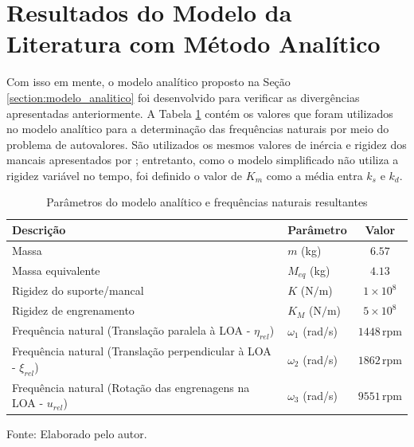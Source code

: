 \section{Resultados do Modelo da Literatura com Método Analítico}

Com isso em mente, o modelo analítico proposto na Seção \ref{section:modelo_analitico} foi desenvolvido para verificar as divergências apresentadas anteriormente. A Tabela \ref{tab:modelo_analitico} contém os valores que foram utilizados no modelo analítico para a determinação das frequências naturais por meio do problema de autovalores. São utilizados os mesmos valores de inércia e rigidez dos mancais apresentados por ; entretanto, como o modelo simplificado não utiliza a rigidez variável no tempo, foi definido o valor de $K_m$ como a média entra $k_s$ e $k_d$.
\begin{table}[H]
	\centering
	\begin{threeparttable}
		\caption{Parâmetros do modelo analítico e frequências naturais resultantes}
		\label{tab:modelo_analitico}
		
		\begin{tabular}{llc}
			\hline
			\textbf{Descrição} & \textbf{Parâmetro} & \textbf{Valor} \\
			\hline
			Massa & $m$ (kg) & $6.57$ \\
			Massa equivalente & $M_{eq}$ (kg) & $4.13$ \\
			Rigidez do suporte/mancal & $K$ ($\mathrm{N/m}$) & $1 \times 10^8$ \\
			Rigidez de engrenamento & $K_M$ ($\mathrm{N/m}$) & $5 \times 10^8$ \\
			\hline
			Frequência natural (Translação paralela à LOA - $\eta_{rel}$) & $\omega_1$ (rad/s) & $1448\,\mathrm{rpm}$ \\
			Frequência natural (Translação perpendicular à LOA - $\xi_{rel}$) & $\omega_2$ (rad/s) & $1862\,\mathrm{rpm}$ \\
			Frequência natural (Rotação das engrenagens na LOA - $u_{rel}$) & $\omega_3$ (rad/s) & $9551\,\mathrm{rpm}$ \\
			\hline
		\end{tabular}
		
		\begin{tablenotes}[para, flushleft]
			\small
			\item Fonte: Elaborado pelo autor.
		\end{tablenotes}
		
	\end{threeparttable}
\end{table}


